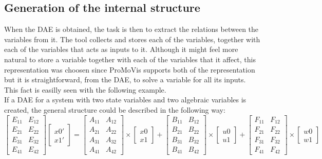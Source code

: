 \subsection{Generation of the internal structure}
When the DAE is obtained, the task is then to extract the relations between the variables from it. The tool collects and stores each of the variables, together with each of the variables that acts as inputs to it. Although it might feel more natural to store a variable together with each of the variables that it affect, this representation was choosen since ProMoVis supports both of the representation but it is straightforward, from the DAE, to solve a variable for all its inputs.\\\newline
This fact is easilly seen with the following example.\\\newline
If a DAE for a system with two state variables and two algebraic variables is created, the general structure could be described in the following way:\\\newline
$
\begin{bmatrix} E_{11} & E_{12} \\ E_{21} & E_{22} \\ E_{31} & E_{32} \\ E_{41} & E_{42} \end{bmatrix} \left[ \begin{array}{c} x0' \\ x1' \end{array} \right]
= \begin{bmatrix} A_{11} & A_{12} \\ A_{21} & A_{22} \\ A_{31} & A_{32} \\ A_{41} & A_{42} \end{bmatrix} \times \left[ \begin{array}{c} x0 \\ x1 \end{array} \right] + \begin{bmatrix} B_{11} & B_{12} \\ B_{21} & B_{22} \\ B_{31} & B_{32} \\ B_{41} & B_{42} \end{bmatrix} \times \left[ \begin{array}{c} u0 \\ u1 \end{array} \right]+
\begin{bmatrix} F_{11} & F_{12} \\ F_{21} & F_{22} \\ F_{31} & F_{32} \\ F_{41} & F_{42}\end{bmatrix} \times \left[ \begin{array}{c} w0 \\ w1 \end{array} \right]$

